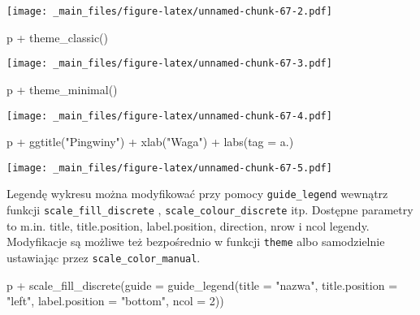\documentclass[
]{book}
\newenvironment{Shaded}{\begin{snugshade}}{\end{snugshade}}
\newcommand{\AttributeTok}[1]{\textcolor[rgb]{0.77,0.63,0.00}{#1}}
\newcommand{\DecValTok}[1]{\textcolor[rgb]{0.00,0.00,0.81}{#1}}
\newcommand{\FunctionTok}[1]{\textcolor[rgb]{0.00,0.00,0.00}{#1}}
\newcommand{\NormalTok}[1]{#1}
\newcommand{\SpecialCharTok}[1]{\textcolor[rgb]{0.00,0.00,0.00}{#1}}
\newcommand{\StringTok}[1]{\textcolor[rgb]{0.31,0.60,0.02}{#1}}
\begin{document}
\texttt{[image: \_main\_files/figure-latex/unnamed-chunk-67-2.pdf]}

\begin{Shaded}
\begin{Highlighting}[]
\NormalTok{p }\SpecialCharTok{+} \FunctionTok{theme\_classic}\NormalTok{()}
\end{Highlighting}
\end{Shaded}

\texttt{[image: \_main\_files/figure-latex/unnamed-chunk-67-3.pdf]}

\begin{Shaded}
\begin{Highlighting}[]
\NormalTok{p }\SpecialCharTok{+} \FunctionTok{theme\_minimal}\NormalTok{()}
\end{Highlighting}
\end{Shaded}

\texttt{[image: \_main\_files/figure-latex/unnamed-chunk-67-4.pdf]}

\begin{Shaded}
\begin{Highlighting}[]
\NormalTok{p }\SpecialCharTok{+} \FunctionTok{ggtitle}\NormalTok{(}\StringTok{"Pingwiny"}\NormalTok{) }\SpecialCharTok{+} \FunctionTok{xlab}\NormalTok{(}\StringTok{"Waga"}\NormalTok{) }\SpecialCharTok{+} \FunctionTok{labs}\NormalTok{(}\AttributeTok{tag =} \StringTok{\textquotesingle{}a.\textquotesingle{}}\NormalTok{)}
\end{Highlighting}
\end{Shaded}

\texttt{[image: \_main\_files/figure-latex/unnamed-chunk-67-5.pdf]}

Legendę wykresu można modyfikować przy pomocy \texttt{guide\_legend} wewnątrz funkcji \texttt{scale\_fill\_discrete} , \texttt{scale\_colour\_discrete} itp. Dostępne parametry to m.in. title, title.position, label.position, direction, nrow i ncol legendy. Modyfikacje są możliwe też bezpośrednio w funkcji \texttt{theme} albo samodzielnie ustawiając przez \texttt{scale\_color\_manual}.

\begin{Shaded}
\begin{Highlighting}[]
\NormalTok{p }\SpecialCharTok{+} \FunctionTok{scale\_fill\_discrete}\NormalTok{(}\AttributeTok{guide =} \FunctionTok{guide\_legend}\NormalTok{(}\AttributeTok{title =} \StringTok{"nazwa"}\NormalTok{, }
                                           \AttributeTok{title.position =} \StringTok{"left"}\NormalTok{, }
                                           \AttributeTok{label.position =} \StringTok{"bottom"}\NormalTok{, }\AttributeTok{ncol =} \DecValTok{2}\NormalTok{))}
\end{Highlighting}
\end{Shaded}
\end{document}
